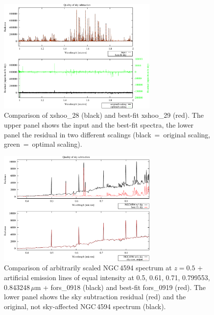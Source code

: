 \begin{figure}
\centering
\includegraphics[width=0.7\textwidth,clip=true]{figures/TEST-XSHOO-1_fit.pdf}
\caption[]{Comparison of xshoo\_28 (black) and best-fit xshoo\_29 (red). The
upper panel shows the input and the best-fit spectra, the lower panel the
residual in two different scalings (black~=~original scaling, green~=~optimal
scaling).}
\label{fig:xshoo_1}
\end{figure}

\begin{figure}
\centering
\includegraphics[width=0.7\textwidth,clip=true]
{figures/N4594-FORS_overplot_w_gal.pdf}
\caption[]{Comparison of arbitrarily scaled NGC\,4594 spectrum at $z = 0.5$ +
artificial emission lines of equal intensity at 0.5, 0.61, 0.71, 0.799553,
0.843248\,$\mu$m + fors\_0918 (black) and best-fit fors\_0919 (red). The lower
panel shows the sky subtraction residual (red) and the original, not
sky-affected NGC\,4594 spectrum (black).}
\label{fig:fors_1_n4594}
\end{figure}

